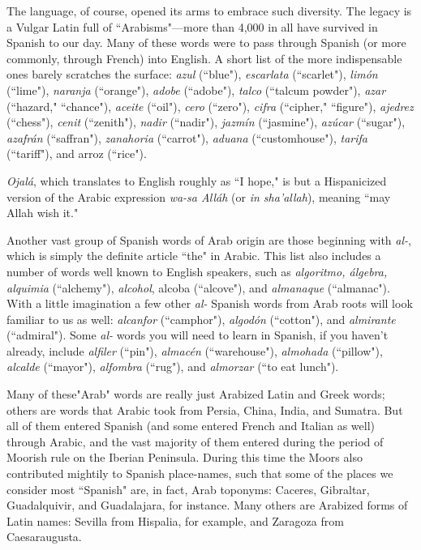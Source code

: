 The language, of course, opened its arms to embrace such
diversity. The legacy is a Vulgar Latin full of ``Arabisms"---more
than 4,000 in all have survived in Spanish to our day. Many of these
words were to pass through Spanish (or more commonly, through
French) into English. A short list of the more indispensable ones
barely scratches the surface: \emph{azul} (``blue"), \emph{escarlata} (``scarlet"), \emph{limón} (``lime"), \emph{naranja} (``orange"), \emph{adobe} (``adobe"), \emph{talco} (``talcum
powder"), \emph{azar} (``hazard," ``chance"), \emph{aceite} (``oil"), \emph{cero} (``zero"), \emph{cifra}
(``cipher," ``figure"), \emph{ajedrez} (``chess"), \emph{cenit} (``zenith"), \emph{nadir} (``nadir"),
\emph{jazmín} (``jasmine"), \emph{azúcar} (``sugar"), \emph{azafrán} (``saffran"), \emph{zanahoria}
(``carrot"), \emph{aduana} (``customhouse"), \emph{tarifa} (``tariff"), and arroz (``rice").

\emph{Ojalá}, which translates to English roughly as ``I hope," is but
a Hispanicized version of the Arabic expression \emph{wa-sa Alláh} (or \emph{in
	sha'allah}), meaning ``may Allah wish it."

Another vast group of Spanish words of Arab origin are those
beginning with \emph{al-}, which is simply the definite article ``the" in Arabic. This list also includes a number of words well known to English
speakers, such as \emph{algoritmo, álgebra, alquimia} (``alchemy"), \emph{alcohol},
alcoba (``alcove"), and \emph{almanaque} (``almanac"). With a little imagination a few other \emph{al-} Spanish words from Arab roots will look familiar
to us as well: \emph{alcanfor} (``camphor"), \emph{algodón} (``cotton"), and \emph{almirante}
(``admiral"). Some \emph{al-} words you will need to learn in Spanish, if you
haven't already, include \emph{alfiler} (``pin"), \emph{almacén} (``warehouse"), \emph{almohada} (``pillow"), \emph{alcalde} (``mayor"), \emph{alfombra} (``rug"), and \emph{almorzar}
(``to eat lunch").

Many of these"Arab" words are really just Arabized Latin and
Greek words; others are words that Arabic took from Persia, China, India, and Sumatra. But all of them entered Spanish (and some entered
French and Italian as well) through Arabic, and the vast majority of
them entered during the period of Moorish rule on the Iberian Peninsula. During this time the Moors also contributed mightily to Spanish
place-names, such that some of the places we consider most ``Spanish"
are, in fact, Arab toponyms: Caceres, Gibraltar, Guadalquivir, and
Guadalajara, for instance. Many others are Arabized forms of Latin
names: Sevilla from Hispalia, for example, and Zaragoza from Caesaraugusta.

